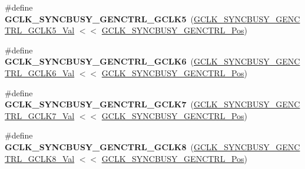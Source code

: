 \begin{DoxyCompactItemize}
\item 
\hypertarget{group___s_a_m_l21___g_c_l_k_gaca76a993c637c2df3e1481eff22ef3c6}{}\#define {\bfseries G\+C\+L\+K\+\_\+\+S\+Y\+N\+C\+B\+U\+S\+Y\+\_\+\+G\+E\+N\+C\+T\+R\+L\+\_\+\+G\+C\+L\+K5}~(\hyperlink{group___s_a_m_l21___g_c_l_k_gad0c64bada7d3d22a4fdf4141293014d2}{G\+C\+L\+K\+\_\+\+S\+Y\+N\+C\+B\+U\+S\+Y\+\_\+\+G\+E\+N\+C\+T\+R\+L\+\_\+\+G\+C\+L\+K5\+\_\+\+Val} $<$$<$ \hyperlink{group___s_a_m_l21___g_c_l_k_gaccbba8857cd7d67c4c0b526841298790}{G\+C\+L\+K\+\_\+\+S\+Y\+N\+C\+B\+U\+S\+Y\+\_\+\+G\+E\+N\+C\+T\+R\+L\+\_\+\+Pos})\label{group___s_a_m_l21___g_c_l_k_gaca76a993c637c2df3e1481eff22ef3c6}

\item 
\hypertarget{group___s_a_m_l21___g_c_l_k_ga53ea9e2a68779ec78ab89471e5565e4a}{}\#define {\bfseries G\+C\+L\+K\+\_\+\+S\+Y\+N\+C\+B\+U\+S\+Y\+\_\+\+G\+E\+N\+C\+T\+R\+L\+\_\+\+G\+C\+L\+K6}~(\hyperlink{group___s_a_m_l21___g_c_l_k_ga10a3a53a51e119577b8bc8b7b525eb7d}{G\+C\+L\+K\+\_\+\+S\+Y\+N\+C\+B\+U\+S\+Y\+\_\+\+G\+E\+N\+C\+T\+R\+L\+\_\+\+G\+C\+L\+K6\+\_\+\+Val} $<$$<$ \hyperlink{group___s_a_m_l21___g_c_l_k_gaccbba8857cd7d67c4c0b526841298790}{G\+C\+L\+K\+\_\+\+S\+Y\+N\+C\+B\+U\+S\+Y\+\_\+\+G\+E\+N\+C\+T\+R\+L\+\_\+\+Pos})\label{group___s_a_m_l21___g_c_l_k_ga53ea9e2a68779ec78ab89471e5565e4a}

\item 
\hypertarget{group___s_a_m_l21___g_c_l_k_ga753965b4b48252ae129bd68444dc36fb}{}\#define {\bfseries G\+C\+L\+K\+\_\+\+S\+Y\+N\+C\+B\+U\+S\+Y\+\_\+\+G\+E\+N\+C\+T\+R\+L\+\_\+\+G\+C\+L\+K7}~(\hyperlink{group___s_a_m_l21___g_c_l_k_gae905cf7ca8bc7ebd6a6537af7fb3ddfa}{G\+C\+L\+K\+\_\+\+S\+Y\+N\+C\+B\+U\+S\+Y\+\_\+\+G\+E\+N\+C\+T\+R\+L\+\_\+\+G\+C\+L\+K7\+\_\+\+Val} $<$$<$ \hyperlink{group___s_a_m_l21___g_c_l_k_gaccbba8857cd7d67c4c0b526841298790}{G\+C\+L\+K\+\_\+\+S\+Y\+N\+C\+B\+U\+S\+Y\+\_\+\+G\+E\+N\+C\+T\+R\+L\+\_\+\+Pos})\label{group___s_a_m_l21___g_c_l_k_ga753965b4b48252ae129bd68444dc36fb}

\item 
\hypertarget{group___s_a_m_l21___g_c_l_k_gaac2bb3e81e5e4e4ab9b53a630887db67}{}\#define {\bfseries G\+C\+L\+K\+\_\+\+S\+Y\+N\+C\+B\+U\+S\+Y\+\_\+\+G\+E\+N\+C\+T\+R\+L\+\_\+\+G\+C\+L\+K8}~(\hyperlink{group___s_a_m_l21___g_c_l_k_ga4bc9fec20abf5638ab612ec6202e5681}{G\+C\+L\+K\+\_\+\+S\+Y\+N\+C\+B\+U\+S\+Y\+\_\+\+G\+E\+N\+C\+T\+R\+L\+\_\+\+G\+C\+L\+K8\+\_\+\+Val} $<$$<$ \hyperlink{group___s_a_m_l21___g_c_l_k_gaccbba8857cd7d67c4c0b526841298790}{G\+C\+L\+K\+\_\+\+S\+Y\+N\+C\+B\+U\+S\+Y\+\_\+\+G\+E\+N\+C\+T\+R\+L\+\_\+\+Pos})\label{group___s_a_m_l21___g_c_l_k_gaac2bb3e81e5e4e4ab9b53a630887db67}


\end{DoxyCompactItemize}
